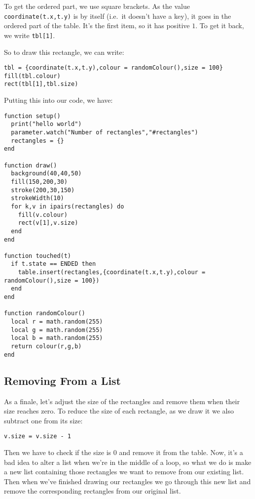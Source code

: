 \documentclass[
  xhtml,%
  use filename%
]{internet}
\begin{document}
To get the ordered part, we use square brackets.
As the value \verb+coordinate(t.x,t.y)+ is by itself (i.e.\ it doesn't have a key), it goes in the ordered part of the table.
It's the first item, so it has positive \(1\).
To get it back, we write \verb+tbl[1]+.

So to draw this rectangle, we can write:

\begin{verbatim}
tbl = {coordinate(t.x,t.y),colour = randomColour(),size = 100}
fill(tbl.colour)
rect(tbl[1],tbl.size)
\end{verbatim}

Putting this into our code, we have:

\begin{verbatim}
function setup()
  print("hello world")
  parameter.watch("Number of rectangles","#rectangles")
  rectangles = {}
end

function draw()
  background(40,40,50)
  fill(150,200,30)
  stroke(200,30,150)
  strokeWidth(10)
  for k,v in ipairs(rectangles) do
    fill(v.colour)
    rect(v[1],v.size)
  end
end

function touched(t)
  if t.state == ENDED then
    table.insert(rectangles,{coordinate(t.x,t.y),colour = randomColour(),size = 100})
  end
end

function randomColour()
  local r = math.random(255)
  local g = math.random(255)
  local b = math.random(255)
  return colour(r,g,b)
end
\end{verbatim}

\subsection{Removing From a List}

As a finale, let's adjust the size of the rectangles and remove them when their size reaches zero.
To reduce the size of each rectangle, as we draw it we also subtract one from its size:

\begin{verbatim}
v.size = v.size - 1
\end{verbatim}

Then we have to check if the size is \(0\) and remove it from the table.
Now, it's a bad idea to alter a list when we're in the middle of a loop, so what we do is make a new list containing those rectangles we want to remove from our existing list.
Then when we've finished drawing our rectangles we go through this new list and remove the corresponding rectangles from our original list.
\end{document}
